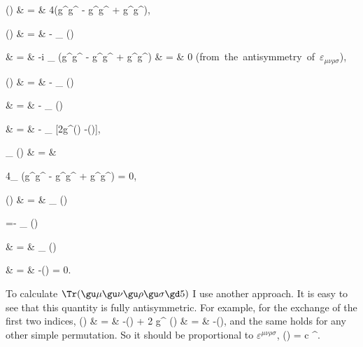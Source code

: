 \nel
\Tr(\gu\mu\gu\nu\gu\rho\gu\sigma)  & = &
  4(g^{\mu\nu}g^{\rho\sigma} - g^{\mu\rho}g^{\nu\sigma}
    + g^{\mu\sigma}g^{\nu\rho}),

\nel
\Tr()  & = &
-  \varepsilon_{\mu\nu\rho\sigma}
  \Tr(\gu\mu \gu\nu \gu\rho \gu\sigma)

\nel
& = &
-i  \varepsilon_{\mu\nu\rho\sigma}
  (g^{\mu\nu}g^{\rho\sigma} - g^{\mu\rho}g^{\nu\sigma}
    + g^{\mu\sigma}g^{\nu\rho})
\nel
 & = & 0 \quad
 \mbox{(from the antisymmetry of $\varepsilon_{\mu\nu\rho\sigma}$)},

\nel
\Tr(\gu{\mu}\gu{\nu})  & = &
-  \varepsilon_{\eta\theta\rho\sigma}
  \Tr(\gu\mu \gu\nu \gu\eta \gu\theta \gu\rho \gu\sigma)

\nel  & = &
-  \varepsilon_{\eta\theta\rho\sigma}
  \Tr(\gu\nu \gu\eta \gu\theta \gu\rho \gu\sigma \gu\mu)

\nel  & = &
-  \varepsilon_{\eta\theta\rho\sigma}
  [2g^{\sigma\mu}\Tr(\gu\nu \gu\eta \gu\theta \gu\rho)
  -\Tr(\gu\nu \gu\eta \gu\theta \gu\rho \gu\mu \gu\sigma)],

\nel
\varepsilon_{\eta\theta\rho\sigma}
\Tr(\gu\nu \gu\eta \gu\theta \gu\rho) & = &

4\varepsilon_{\eta\theta\rho\sigma}
   (g^{\nu\eta}g^{\theta\rho} - g^{\nu\theta}g^{\eta\rho}
    + g^{\nu\rho}g^{\eta\theta}) = 0,

\nel
\Tr(\gu{\mu}\gu{\nu})  & = &
 \varepsilon_{\eta\theta\rho\sigma}
  \Tr(\gu\nu \gu\eta \gu\theta \gu\rho \gu\mu \gu\sigma)

=- \varepsilon_{\eta\theta\rho\sigma}
  \Tr(\gu\nu \gu\eta \gu\theta \gu\mu \gu\rho \gu\sigma)

\nel & = &  \varepsilon_{\eta\theta\rho\sigma}
  \Tr(\gu\mu \gu\nu \gu\eta \gu\theta \gu\rho \gu\sigma)

\nel & = & -\Tr(\gu{\mu}\gu{\nu}) = 0.

\ee

To calculate $\Tr(\gu\mu\gu\nu\gu\rho\gu\sigma\gd5)$ I use another approach.
It is easy to see that this quantity is fully antisymmetric. For example,
for the exchange of the first two indices,
\bem
\Tr(\gu\mu\gu\nu\gu\rho\gu\sigma{}) & = &
-\Tr(\gu\nu\gu\mu\gu\rho\gu\sigma{})
+ 2 g^{\mu\nu} \Tr(\gu\rho\gu\sigma{})
\nel & = & -\Tr(\gu\nu\gu\mu\gu\rho\gu\sigma{}),
\ee
and the same holds 
for any other simple permutation. So it should be proportional
to $\varepsilon^{\mu\nu\rho\sigma}$,
\be
\Tr(\gu\mu\gu\nu\gu\rho\gu\sigma{}) = c \varepsilon^{\mu\nu\rho\sigma}.
\ee

